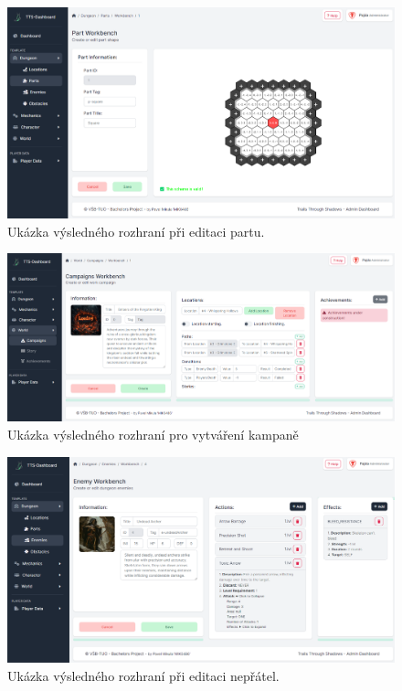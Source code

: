 \begin{figure}
    \centering
    \includegraphics[width=1.0\textwidth]{figures/dashboardWorkbenchPart}
    \caption{Ukázka výsledného rozhraní při editaci partu.}
    \label{fig:interfaceScreenshotsWorkbench}
\end{figure}

\begin{figure}
    \centering
    \includegraphics[width=1.0\textwidth]{figures/dashboardWorkbenchCampaign}
    \caption{Ukázka výsledného rozhraní pro vytváření kampaně}
    \label{fig:interfaceScreenshotsWorkbenchCampaign}
\end{figure}

\begin{figure}
    \centering
    \includegraphics[width=1.0\textwidth]{figures/dashboardWorkbenchEnemy}
    \caption{Ukázka výsledného rozhraní při editaci nepřátel.}
    \label{fig:interfaceScreenshotsWorkbenchEnemy}
\end{figure}

